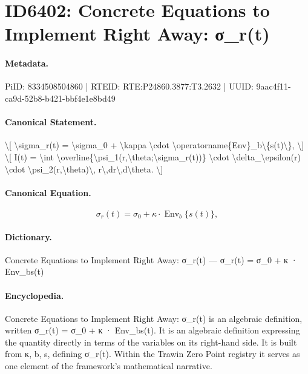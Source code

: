 \section*{ID6402: Concrete Equations to Implement Right Away: σ\_r(t)}
\paragraph{Metadata.}
PiID: 8334508504860 | RTEID: RTE:P24860.3877:T3.2632 | UUID: 9aac4f11-ca9d-52b8-b421-bbf4e1e8bd49

\paragraph{Canonical Statement.}
\textbackslash{}[ \textbackslash{}sigma\_r(t) = \textbackslash{}sigma\_0 + \textbackslash{}kappa \textbackslash{}cdot \textbackslash{}operatorname\{Env\}\_b\textbackslash{}\{s(t)\textbackslash{}\}, \textbackslash{}] \textbackslash{}[ I(t) = \textbackslash{}int \textbackslash{}overline\{\textbackslash{}psi\_1(r,\textbackslash{}theta;\textbackslash{}sigma\_r(t))\} \textbackslash{}cdot \textbackslash{}delta\_\textbackslash{}epsilon(r) \textbackslash{}cdot \textbackslash{}psi\_2(r,\textbackslash{}theta)\textbackslash{}, r\textbackslash{},dr\textbackslash{},d\textbackslash{}theta. \textbackslash{}]

\paragraph{Canonical Equation.}
\[
\sigma_r(t) = \sigma_0 + \kappa \cdot \operatorname{Env}_b\{s(t)\},
\]

\paragraph{Dictionary.}
Concrete Equations to Implement Right Away: σ\_r(t) — σ\_r(t) = σ\_0 + κ · Env\_bs(t)

\paragraph{Encyclopedia.}
Concrete Equations to Implement Right Away: σ\_r(t) is an algebraic definition, written σ\_r(t) = σ\_0 + κ · Env\_bs(t). It is an algebraic definition expressing the quantity directly in terms of the variables on its right-hand side. It is built from κ, b, s, defining σ\_r(t). Within the Trawin Zero Point registry it serves as one element of the framework's mathematical narrative.
